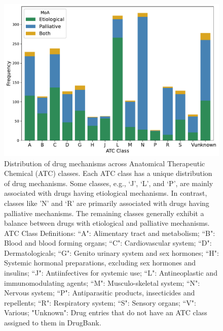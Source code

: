 \documentclass[journal,twoside,web]{ieeecolor}
\begin{document}
\begin{figure}[H]
    \centering
    \includegraphics[width=\linewidth]{Figures/EPvsATC.pdf}
    \caption{ Distribution of drug mechanisms across Anatomical Therapeutic Chemical (ATC) classes.
    Each ATC class has a unique distribution of drug mechanisms.
    Some classes, e.g., `J', `L', and `P', are mainly associated with drugs having etiological mechanisms.
    In contrast, classes like 'N' and `R' are primarily associated with drugs having palliative mechanisms.
    The remaining classes generally exhibit a balance between drugs with etiological and palliative mechanisms.
    ATC Class Definitions:
   ``A": Alimentary tract and metabolism;
   ``B": Blood and blood forming organs;
   ``C": Cardiovascular system;
   ``D": Dermatologicals;
   ``G": Genito urinary system and sex hormones;
   ``H": Systemic hormonal preparations, excluding sex hormones and insulins;
   ``J": Antiinfectives for systemic use;
   ``L": Antineoplastic and immunomodulating agents;
   ``M": Musculo-skeletal system;
   ``N": Nervous system;
   ``P": Antiparasitic products, insecticides and repellents;
   ``R": Respiratory system;
   ``S": Sensory organs;
   ``V": Various;
   "Unknown": Drug entries that do not have an ATC class assigned to them in DrugBank.
    }
    \label{fig:EPvsATC}
\end{figure}
\end{document}
